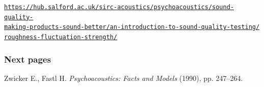 \documentclass{article}
\begin{document}
\noindent \href{https://hub.salford.ac.uk/sirc-acoustics/psychoacoustics/sound-quality-making-products-sound-better/an-introduction-to-sound-quality-testing/roughness-fluctuation-strength/}{\texttt{\small https://hub.salford.ac.uk/sirc-acoustics/psychoacoustics/sound-quality-\\ \noindent making-products-sound-better/an-introduction-to-sound-quality-testing/\\ \noindent roughness-fluctuation-strength/}}

\subsubsection*{Next pages}

Zwicker E., Fastl H. \textit{Psychoacoustics: Facts and Models} (1990), pp. 247--264.


\end{document}
